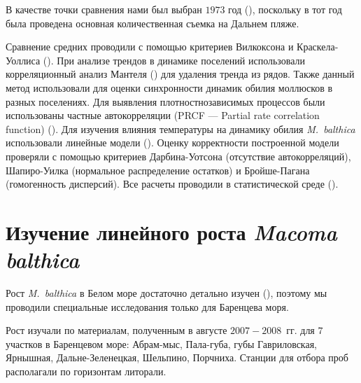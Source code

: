 В качестве точки сравнения нами был выбран $1973$ год (\cite{Streltsov_et_al_1974, Agarova_et_al_1976}), поскольку в тот год была проведена основная количественная съемка на Дальнем пляже. 


Сравнение средних проводили с помощью критериев Вилкоксона и Краскела-Уоллиса (\cite{Hollander_et_al_2013}).
При анализе трендов в динамике поселений использовали корреляционный анализ Мантеля (\cite{Legendre_Legendre_2012}) для удаления тренда из рядов. 
Также данный метод использовали для оценки синхронности динамик обилия моллюсков в разных поселениях.
Для выявления плотностнозависимых процессов были использованы частные автокорреляции (PRCF --- Partial rate correlation function) (\cite{Berryman_Turchin_2001}).
Для изучения влияния температуры на динамику обилия \textit{M.~balthica} использовали линейные модели (\cite{Chambers_Hastie_1991}).
Оценку корректности построенной модели проверяли с помощью критериев Дарбина-Уотсона (отсутствие автокорреляций), Шапиро-Уилка (нормальное распределение остатков) и Бройше-Пагана (гомогенность дисперсий).
Все расчеты проводили в статистической среде \R{} (\cite{R_2014}).

\afterpage{\clearpage}

	\section{Изучение линейного роста {\it Macoma balthica}}
Рост \textit{M.~balthica} в Белом море достаточно детально изучен (\cite{Semenova_1970, Maximovich_et_al_1992, Hummel_et_al_1998}), поэтому мы проводили специальные исследования только для Баренцева моря.

Рост изучали по материалам, полученным в августе $2007 - 2008$~гг. для $7$ участков в Баренцевом море: Абрам-мыс, Пала-губа, губы Гавриловская, Ярнышная, Дальне-Зеленецкая, Шельпино, Порчниха.
Станции для отбора проб располагали по горизонтам литорали. 

